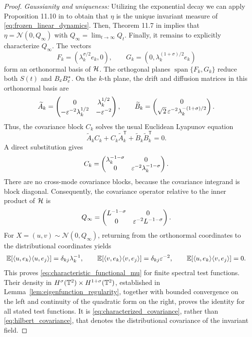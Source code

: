 \begin{proof}
\emph{Gaussianity and uniqueness:}
Utilizing the exponential decay we can apply Proposition 11.10 in \cite{DaPrato_Zabczyk_2014} to obtain that $\eta$ is the unique invariant measure of \eqref{eq:frozen_linear_dynamics}. Then, Theorem 11.7 in \cite{DaPrato_Zabczyk_2014} implies that $\eta = \mathcal{N}(0, Q_\infty)$ with $Q_\infty = \lim_{t\to\infty} Q_t$.
Finally, it remains to explicitly characterize $Q_\infty$. 
The vectors
\[
 F_k=(\lambda_k^{\sigma/2}e_k,0),\qquad
 G_k=(0,\lambda_k^{(1+\sigma)/2}e_k)
\]
form an orthonormal basis of \(\mathcal{H}\). The orthogonal planes
\(\operatorname{span}\{F_k,G_k\}\) reduce both \(S(t)\) and
\(B_\varepsilon B_\varepsilon^*\). On the \(k\)-th plane, the drift and diffusion
matrices in this orthonormal basis are
\[
 \widetilde A_k=
 \begin{pmatrix}
 0&\lambda_k^{1/2}\\
 -\varepsilon^{-2}\lambda_k^{1/2}&-\varepsilon^{-2}
 \end{pmatrix},\qquad
 \widetilde B_k=
 \begin{pmatrix}0\\ \sqrt2\,\varepsilon^{-2}\lambda_k^{-(1+\sigma)/2}\end{pmatrix}.
\]
Thus, the covariance block \(C_k\) solves the usual Euclidean
Lyapunov equation
\begin{equation}\label{lyapunov_eq}
 \widetilde A_kC_k+C_k\widetilde A_k^{\mathsf T}
       +\widetilde B_k\widetilde B_k^{\mathsf T}=0.
\end{equation}
A direct substitution gives
\[
 C_k=\begin{pmatrix}
       \lambda_k^{-1-\sigma}&0\\
       0&\varepsilon^{-2}\lambda_k^{-1-\sigma}
     \end{pmatrix}.
\]
There are no cross-mode covariance blocks, because the covariance
integrand is block diagonal. Consequently, the covariance operator
relative to the inner product of \(\mathcal{H}\) is
\begin{equation}\label{eq:hilbert_covariance}
 Q_\infty=
 \begin{pmatrix}
    L^{-1-\sigma}&0\\
    0&\varepsilon^{-2}L^{-1-\sigma}
 \end{pmatrix}.
\end{equation}
For \(X=(u,v)\sim\mathcal N(0,Q_\infty)\), returning from the
orthonormal coordinates to the distributional coordinates yields
\[
 \mathbb E[\langle u,e_k\rangle\langle u,e_j\rangle]
     =\delta_{kj}\lambda_k^{-1},\qquad
 \mathbb E[\langle v,e_k\rangle\langle v,e_j\rangle]
     =\delta_{kj}\varepsilon^{-2},
 \qquad
 \mathbb E[\langle u,e_k\rangle\langle v,e_j\rangle]=0.
\]
This proves \eqref{eq:characteristic_functional_mu} for finite
spectral test functions. Their density in
\(H^\sigma(\mathbb{T}^2)\times H^{1+\sigma}(\mathbb{T}^2)\), established in Lemma~\ref{lem:eigenfunction_regularity}, together with bounded convergence
on the left and continuity of the quadratic form on the right,
proves the identity for all stated test functions.
It is \eqref{eq:characterized_covariance}, rather than
\eqref{eq:hilbert_covariance}, that denotes the distributional
covariance of the invariant field.
\end{proof}


